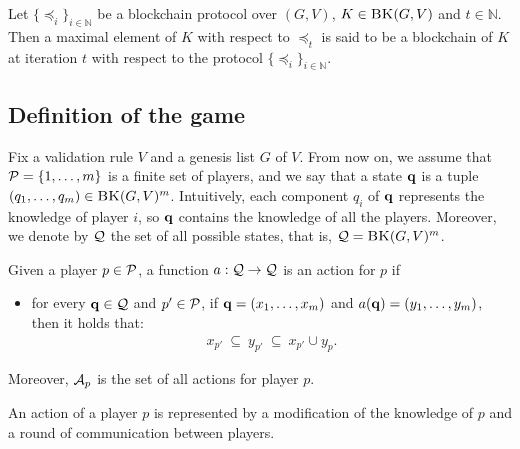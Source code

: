 \begin{mydef}
	Let $\{ \preceq_i\}_{i \in \mathbb{N}}$ be a blockchain protocol over $(G,V)$, $K \in \text{\sc BK}(G,V)$ and $t \in \mathbb{N}$. 
	Then a maximal element of $K$ with respect to $\preceq_t$ is said to be a blockchain of $K$ at iteration $t$ with respect to the protocol $\{ \preceq_i\}_{i \in \mathbb{N}}$.
\end{mydef}




\subsection{Definition of the game}

Fix a validation rule $V$ and a genesis list $G$ of $V$. From now on, we assume that $\mathcal{P} = \{1, \ldots, m\}$ is a finite set of players, and we say that a state $\mathbf{q}$ is a tuple $(q_1, \ldots, q_m) \in \text{\sc BK}(G,V)^m$. Intuitively, each component $q_i$ of $\mathbf{q}$ represents the knowledge of player $i$, so $\mathbf{q}$ contains the knowledge of all the players. Moreover, we denote by $\mathcal{Q}$ the set of all possible states, that is, $\mathcal{Q} = \text{\sc BK}(G,V)^m$.




\begin{mydef}\label{def-action}
Given a player $p \in \mathcal{P}$, a function $a : \mathcal{Q} \to \mathcal{Q}$ is an action for $p$ if
\begin{itemize}
\item for every $\mathbf{q} \in \mathcal{Q}$ and $p' \in \mathcal{P}$, if $\mathbf{q} = (x_1, \ldots, x_m)$ and $a(\mathbf{q}) = (y_1, \ldots, y_m)$, then it holds that:
\begin{eqnarray*}
x_{p'} \ \subseteq \ y_{p'} \ \subseteq \ x_{p'} \cup y_p.
\end{eqnarray*}

\end{itemize}
Moreover, $\mathcal{A}_p$ is the set of all actions for player $p$.
\end{mydef}
An action of a player $p$ is represented by a modification of the knowledge of $p$ and a round of communication between players. 

